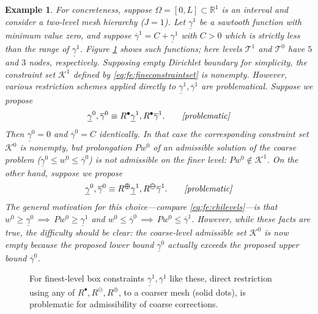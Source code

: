 \documentclass[letterpaper,final,12pt,reqno]{amsart}
\theoremstyle{cstyle}
\theoremstyle{cstyle*}
\theoremstyle{dstyle}
\newtheorem{example}[theorem]{Example}
\numberwithin{equation}{section}
\numberwithin{figure}{section}
\numberwithin{table}{section}
\numberwithin{theorem}{section}
\newcommand{\RR}{\mathbb{R}}
\newcommand{\maxR}{R^{\bm{\oplus}}}
\newcommand{\minR}{R^{\bm{\ominus}}}
\newcommand{\iR}{R^{\bullet}}
\begin{document}
\begin{example}  \label{ex:directRbad}  
For concreteness, suppose $\Omega = [0,L] \subset \RR^1$ is an interval and consider a two-level mesh hierarchy ($J=1$).  Let $\underline{\gamma}^1$ be a sawtooth function with minimum value zero, and suppose $\overline{\gamma}^1=C+\underline{\gamma}^1$ with $C>0$ which is strictly less than the range of $\underline{\gamma}^1$.  Figure \ref{fig:directRbad} shows such functions; here levels $\mathcal{T}^1$ and $\mathcal{T}^0$ have $5$ and $3$ nodes, respectively.  Supposing empty Dirichlet boundary for simplicity, the constraint set $\mathcal{K}^1$ defined by \eqref{eq:fe:fineconstraintset} is nonempty.  However, various restriction schemes applied directly to $\underline{\gamma}^1,\overline{\gamma}^1$ are problematical.  Suppose we propose
    $$\underline{\gamma}^0, \overline{\gamma}^0 \equiv \iR \underline{\gamma}^1, \iR \overline{\gamma}^1. \qquad \text{\emph{[problematic]}}$$
Then $\underline{\gamma}^0=0$ and $\overline{\gamma}^0=C$ identically.  In that case the corresponding constraint set $\mathcal{K}^0$ is nonempty, but prolongation $Pw^0$ of an admissible solution of the coarse problem ($\underline{\gamma}^0 \le w^0 \le \overline{\gamma}^0$) is not admissible on the finer level: $Pw^0 \notin \mathcal{K}^1$.  On the other hand, suppose we propose
    $$\underline{\gamma}^0, \overline{\gamma}^0 \equiv \maxR \underline{\gamma}^1, \minR \overline{\gamma}^1. \qquad \text{\emph{[problematic]}}$$
The general motivation for this choice---compare \eqref{eq:fe:chilevels}---is that $w^0 \ge \underline{\gamma}^0 \, \implies \, Pw^0 \ge \underline{\gamma}^1$ and $w^0 \le \overline{\gamma}^0 \, \implies \, Pw^0 \le \overline{\gamma}^1$.  However, while these facts are true, the difficulty should be clear: the coarse-level admissible set $\mathcal{K}^0$ is now empty because the proposed lower bound $\underline{\gamma}^0$ actually exceeds the proposed upper bound $\overline{\gamma}^0$.
\end{example}

\begin{figure}[ht]
\begin{center}

\end{center}
\caption{For finest-level box constraints $\underline{\gamma}^1,\overline{\gamma}^1$ like these, direct restriction using any of $\iR,\minR,\maxR$, to a coarser mesh (solid dots), is problematic for admissibility of coarse corrections.}
\label{fig:directRbad}
\end{figure}
\end{document}
